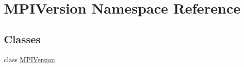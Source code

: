 \hypertarget{namespace_m_p_i_version}{\section{M\-P\-I\-Version Namespace Reference}
\label{namespace_m_p_i_version}
}
\subsection*{Classes}
\begin{DoxyCompactItemize}
\item 
class \hyperlink{class_m_p_i_version_1_1_m_p_i_version}{M\-P\-I\-Version}
\end{DoxyCompactItemize}

